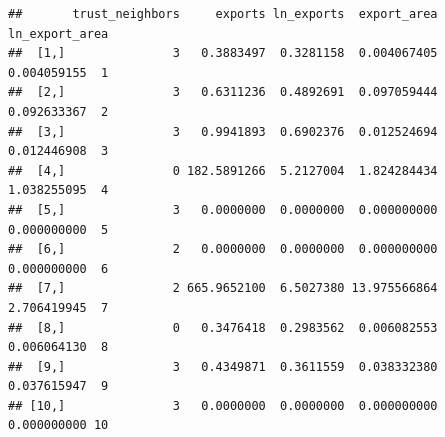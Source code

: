 \documentclass[]{book}
\newenvironment{Shaded}{\begin{snugshade}}{\end{snugshade}}
\newcommand{\CommentTok}[1]{\textcolor[rgb]{0.56,0.35,0.01}{\textit{#1}}}
\newcommand{\DecValTok}[1]{\textcolor[rgb]{0.00,0.00,0.81}{#1}}
\newcommand{\KeywordTok}[1]{\textcolor[rgb]{0.13,0.29,0.53}{\textbf{#1}}}
\newcommand{\NormalTok}[1]{#1}
\newcommand{\OperatorTok}[1]{\textcolor[rgb]{0.81,0.36,0.00}{\textbf{#1}}}
\newcommand{\StringTok}[1]{\textcolor[rgb]{0.31,0.60,0.02}{#1}}
\theoremstyle{definition}
\theoremstyle{definition}
\theoremstyle{definition}
\theoremstyle{remark}
\begin{document}
\begin{Shaded}
\begin{Highlighting}[]
\begin{Shaded}
\begin{Highlighting}[]
\begin{Shaded}
\end{Shaded}

\begin{verbatim}
##       trust_neighbors     exports ln_exports  export_area ln_export_area   
##  [1,]               3   0.3883497  0.3281158  0.004067405    0.004059155  1
##  [2,]               3   0.6311236  0.4892691  0.097059444    0.092633367  2
##  [3,]               3   0.9941893  0.6902376  0.012524694    0.012446908  3
##  [4,]               0 182.5891266  5.2127004  1.824284434    1.038255095  4
##  [5,]               3   0.0000000  0.0000000  0.000000000    0.000000000  5
##  [6,]               2   0.0000000  0.0000000  0.000000000    0.000000000  6
##  [7,]               2 665.9652100  6.5027380 13.975566864    2.706419945  7
##  [8,]               0   0.3476418  0.2983562  0.006082553    0.006064130  8
##  [9,]               3   0.4349871  0.3611559  0.038332380    0.037615947  9
## [10,]               3   0.0000000  0.0000000  0.000000000    0.000000000 10
\end{verbatim}

\begin{Shaded}
\end{Shaded}


\end{Highlighting}
\end{Shaded}
\end{Highlighting}
\end{Shaded}
\end{document}
